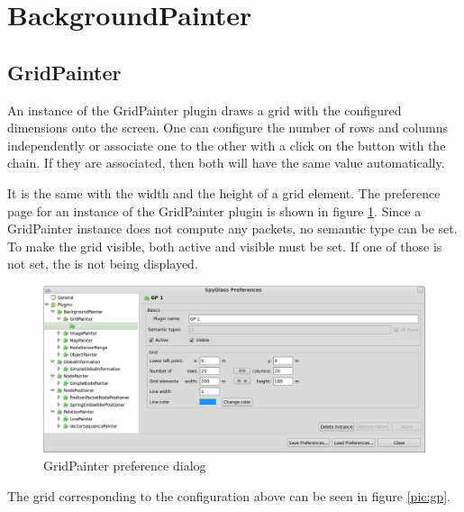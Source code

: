 \newpage
\section{BackgroundPainter}

\subsection{GridPainter}

An instance of the GridPainter plugin draws a grid with the configured dimensions onto the screen.
One can configure the number of rows and columns independently or associate one to the other with a click
on the button with the chain. If they are associated, then both will have the same value automatically.

It is the same with the width and the height of a grid element. The preference page for an instance of the GridPainter
plugin is shown in figure \ref{pic:gp_preferences}. Since a GridPainter instance does not compute any packets, no semantic type
can be set. To make the grid visible, both active and visible must be set. If one of those is not set, the
is not being displayed.

\begin{figure}[htb]
  \begin{center}
    \includegraphics[width=13.2cm]{./pics/gridpainter_prefpage}
    \caption{GridPainter preference dialog}
    \label{pic:gp_preferences}
  \end{center}
\end{figure}

The grid corresponding to the configuration above can be seen in figure \ref{pic:gp}.

